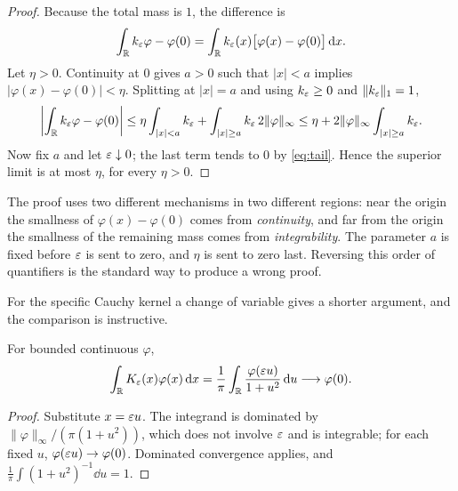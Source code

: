\begin{proof}
Because the total mass is $1$, the difference is
\begin{equation}
\int_{\mathbb{R}}k_{\varepsilon}\varphi-\varphi(0)=\int_{\mathbb{R}}k_{\varepsilon}(x)\big[\varphi(x)-\varphi(0)\big]\,\mathrm{d} x .
\end{equation}
Let $\eta>0$. Continuity at $0$ gives $a>0$ such that $|x|<a$ implies
$|\varphi(x)-\varphi(0)|<\eta$. Splitting at $|x|=a$ and using $k_{\varepsilon}\ge0$ and
$\|k_{\varepsilon}\|_{1}=1$,
\begin{equation}
\left|\int_{\mathbb{R}}k_{\varepsilon}\varphi-\varphi(0)\right|
\le\eta\int_{|x|<a}k_{\varepsilon}+\int_{|x|\ge a}k_{\varepsilon}\,2\|\varphi\|_{\infty}
\le\eta+2\|\varphi\|_{\infty}\int_{|x|\ge a}k_{\varepsilon}.
\end{equation}
Now fix $a$ and let $\varepsilon\downarrow0$; the last term tends to $0$ by \eqref{eq:tail}. Hence the
superior limit is at most $\eta$, for every $\eta>0$.
\end{proof}

\begin{remark}
The proof uses two different mechanisms in two different regions: near the origin the smallness of
$\varphi(x)-\varphi(0)$ comes from \emph{continuity}, and far from the origin the smallness of the
remaining mass comes from \emph{integrability}. The parameter $a$ is fixed before $\varepsilon$ is sent to
zero, and $\eta$ is sent to zero last. Reversing this order of quantifiers is the standard way to
produce a wrong proof.
\end{remark}

For the specific Cauchy kernel a change of variable gives a shorter argument, and the comparison is
instructive.

\begin{proposition}\label{prop:cauchy-sub}
For bounded continuous $\varphi$,
\begin{equation}
\int_{\mathbb{R}}K_{\varepsilon}(x)\varphi(x)\,\mathrm{d} x=\frac{1}{\pi}\int_{\mathbb{R}}\frac{\varphi(\varepsilon u)}{1+u^{2}}\,\mathrm{d} u
\longrightarrow\varphi(0).
\end{equation}
\end{proposition}

\begin{proof}
Substitute $x=\varepsilon u$. The integrand is dominated by
$\|\varphi\|_{\infty}/(\pi(1+u^{2}))$, which does not involve $\varepsilon$ and is integrable; for each fixed
$u$, $\varphi(\varepsilon u)\to\varphi(0)$. Dominated convergence applies, and
$\frac{1}{\pi}\int(1+u^{2})^{-1}\dd u=1$.
\end{proof}

